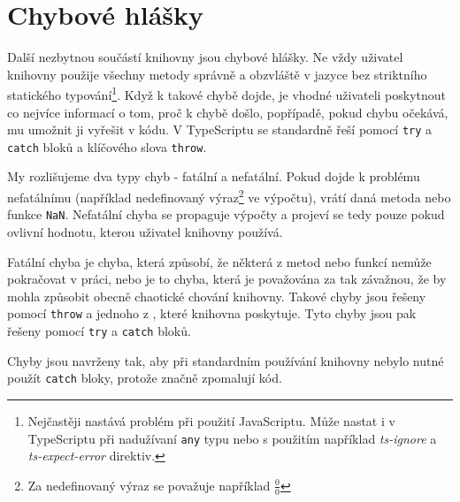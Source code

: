 \chapter{Chybové hlášky}
\label{chap:error-messages}

Další nezbytnou součástí knihovny jsou chybové hlášky.
Ne vždy uživatel knihovny použije všechny metody správně a obzvláště v jazyce bez striktního statického typování\footnote{Nejčastěji nastává problém při použití JavaScriptu. Může nastat i v TypeScriptu při nadužívaní \texttt{any} typu nebo s použitím například \textit{ts-ignore} a \textit{ts-expect-error} direktiv.}.
Když k takové chybě dojde, je vhodné uživateli poskytnout co nejvíce informací o tom, proč k chybě došlo, popřípadě, pokud chybu očekává, mu umožnit ji vyřešit v kódu.
V TypeScriptu se  standardně řeší pomocí \texttt{try} a \texttt{catch} bloků a klíčového slova \texttt{throw}\cite{mdn:try-catch}.

My rozlišujeme dva typy chyb - fatální a nefatální. Pokud dojde k problému nefatálnímu (například nedefinovaný výraz\footnote{Za nedefinovaný výraz se považuje například $\frac{0}{0}$} ve výpočtu), vrátí daná metoda nebo funkce \texttt{NaN}\cite{geometryjs:wiki:errors}.
Nefatální chyba se propaguje výpočty a projeví se tedy pouze pokud ovlivní hodnotu, kterou uživatel knihovny používá\cite{geometryjs:wiki:errors}.

Fatální chyba je chyba, která způsobí, že některá z metod nebo funkcí nemůže pokračovat v práci, nebo je to chyba, která je považována za tak závažnou, že by mohla způsobit obecně chaotické chování knihovny.
Takové chyby jsou řešeny pomocí \texttt{throw} a jednoho z , které knihovna poskytuje.
Tyto chyby jsou pak řešeny pomocí \texttt{try} a \texttt{catch} bloků.

Chyby jsou navrženy tak, aby při standardním používání knihovny nebylo nutné použít \texttt{catch} bloky\cite{geometryjs:wiki:errors}, protože značně zpomalují kód\cite{stackoverflow:try-catch-performance:2013}.